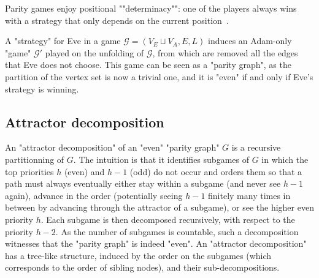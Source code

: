 \documentclass[a4paper,UKenglish,cleveref, autoref, thm-restate]{lipics-v2021}
\newcommand{\G}{\mathcal{G}}
\begin{document}
\AP Parity games enjoy positional ""determinacy"": one of the players always wins with a strategy that only depends on the current position~\cite{EJ91}.

A "strategy" for Eve in a game $\G = (V_E\sqcup V_A,E,L)$ induces an Adam-only "game" $\G'$ played on the unfolding of $\G$, from which are removed all the edges that Eve does not choose. This game can be seen as a "parity graph", as the partition of the vertex set is now a trivial one, and it is "even" if and only if Eve's strategy is winning.

\subsection{Attractor decomposition}

An "attractor decomposition" of an "even" "parity graph" $G$ is a recursive partitionning of $G$. The intuition is that it identifies subgames of $G$ in which the top priorities $h$ (even) and $h-1$ (odd) do not occur and orders them so that a path must always eventually either stay within a subgame (and never see $h-1$ again), advance in the order (potentially seeing $h-1$ finitely many times in between by advancing through the attractor of a subgame), or see the higher even priority $h$. Each subgame is then decomposed recursively, with respect to the priority $h-2$. As the number of subgames is countable, such a decomposition witnesses that the "parity graph" is indeed "even".
An "attractor decomposition" has a tree-like structure, induced by the order on the subgames (which corresponds to the order of sibling nodes), and their sub-decompositions.
\end{document}
